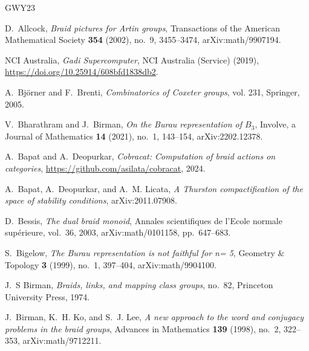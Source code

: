 \documentclass[a4paper]{amsart}
\newcommand{\0}{\mathbf{0}}
\theoremstyle{theorem}
\begin{document}

\providecommand{\bysame}{\leavevmode\hbox to3em{\hrulefill}\thinspace}
\providecommand{\MR}{\relax\ifhmode\unskip\space\fi MR }
\providecommand{\MRhref}[2]{\href{http://www.ams.org/mathscinet-getitem?mr=#1}{#2}
}
\providecommand{\href}[2]{#2}
\begin{thebibliography}{GWY23}

D.~Allcock, \emph{Braid pictures for {A}rtin groups}, Transactions of the
  American Mathematical Society \textbf{354} (2002), no.~9, 3455--3474,
  \href{https://arxiv.org/abs/math/9907194}{arXiv:math/9907194}.

NCI Australia, \emph{{G}adi {S}upercomputer}, NCI Australia (Service) (2019),
  \url{https://doi.org/10.25914/608bfd1838db2}.

A.~Bj{\"o}rner and F.~Brenti, \emph{Combinatorics of {C}oxeter groups}, vol.
  231, Springer, 2005.

V.~Bharathram and J.~Birman, \emph{On the {B}urau representation of {$B_3$}},
  Involve, a Journal of Mathematics \textbf{14} (2021), no.~1, 143--154,
  \href{https://arxiv.org/abs/2202.12378}{arXiv:2202.12378}.

A.~Bapat and A.~Deopurkar, \emph{Cobracat: Computation of braid actions on
  categories}, \url{https://github.com/asilata/cobracat}, 2024.

A.~Bapat, A.~Deopurkar, and A.~M. Licata, \emph{A {T}hurston compactification
  of the space of stability conditions},
  \href{http://arxiv.org/abs/2011.07908}{arXiv:2011.07908}.

D.~Bessis, \emph{The dual braid monoid}, Annales scientifiques de l’Ecole
  normale sup{\'e}rieure, vol.~36, 2003,
  \href{http://arxiv.org/abs/math/0101158}{arXiv:math/0101158}, pp.~647--683.

S.~Bigelow, \emph{The {B}urau representation is not faithful for n= 5},
  Geometry \& Topology \textbf{3} (1999), no.~1, 397--404,
  \href{https://arxiv.org/abs/math/9904100}{arXiv:math/9904100}.

J.~S Birman, \emph{Braids, links, and mapping class groups}, no.~82, Princeton
  University Press, 1974.

J.~Birman, K.~H. Ko, and S.~J. Lee, \emph{A new approach to the word and
  conjugacy problems in the braid groups}, Advances in Mathematics \textbf{139}
  (1998), no.~2, 322--353,
  \href{http://arxiv.org/abs/math/9712211}{arXiv:math/9712211}.


\end{thebibliography}
\end{document}

